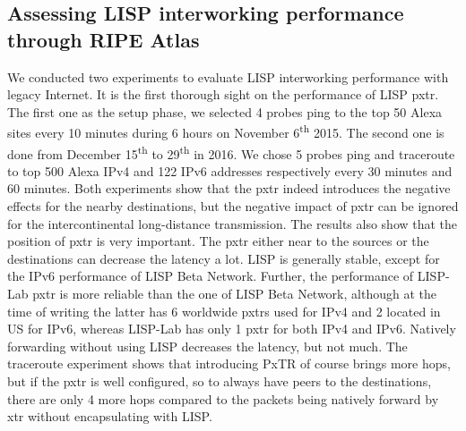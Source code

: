 \subsection{Assessing LISP interworking performance through RIPE Atlas}
We conducted two experiments to evaluate LISP interworking performance with legacy Internet. It is the first thorough sight on the performance of LISP \acrfull{pxtr}. The first one as the setup phase, we selected 4 probes ping to the top 50 Alexa sites every 10 minutes during 6 hours on November 6\textsuperscript{th} 2015. The second one is done from December 15\textsuperscript{th} to 29\textsuperscript{th} in 2016. We chose 5 probes ping and traceroute to top 500 Alexa IPv4 and 122 IPv6 addresses respectively every 30 minutes and 60 minutes. Both experiments show that the \acrshort{pxtr} indeed introduces the negative effects for the nearby destinations, but the negative impact of \acrshort{pxtr} can be ignored for the intercontinental long-distance transmission. The results also show that the position of \acrshort{pxtr} is very important. The \acrshort{pxtr} either near to the sources or the destinations can decrease the latency a lot. LISP is generally stable, except for the IPv6 performance of LISP Beta Network. Further, the performance of LISP-Lab \acrshort{pxtr} is more reliable than the one of LISP Beta Network, although at the time of writing the latter has 6 worldwide \acrshort{pxtr}s used for IPv4 and 2 located in US for IPv6, whereas LISP-Lab has only 1 \acrshort{pxtr} for both IPv4 and IPv6. Natively forwarding without using LISP decreases the latency, but not much. The traceroute experiment shows that introducing PxTR of course brings more hops, but if the \acrshort{pxtr} is well configured, so to always have peers to the destinations, there are only 4 more hops compared to the packets being natively forward by \acrshort{xtr} without encapsulating with LISP. 

